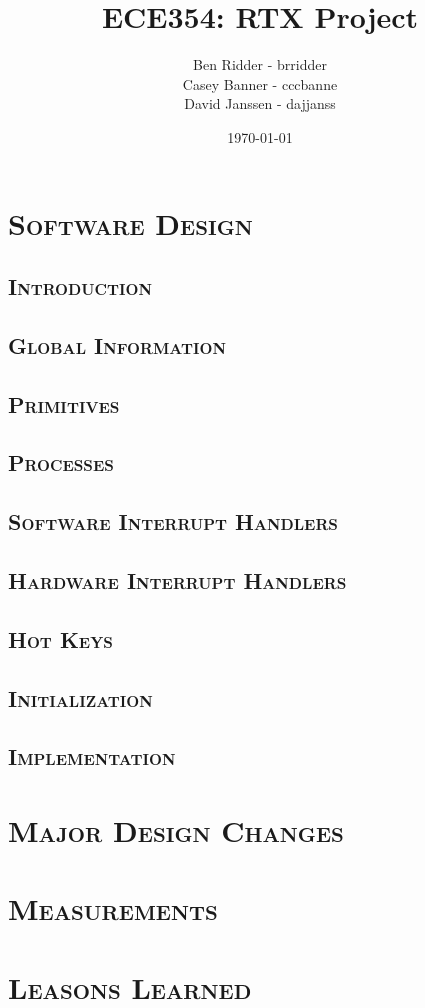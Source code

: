 \documentclass[oneside]{report}
\begin{document}
\lstset{language=C, 
        frame=single, 
        breaklines=true,
        basicstyle=\small\ttfamily,
        columns=fullflexible}

\title{ECE354: RTX Project}
\author{Ben Ridder - brridder \\
Casey Banner - cccbanne \\
David Janssen - dajjanss }
\date{\today}
\maketitle
\tableofcontents
\chapter{\textsc{Software Design}}

\section{\textsc{Introduction}}

\section{\textsc{Global Information}}

\section{\textsc{Primitives}}

\section{\textsc{Processes}}

\section{\textsc{Software Interrupt Handlers}}

\section{\textsc{Hardware Interrupt Handlers}}

\section{\textsc{Hot Keys}}

\section{\textsc{Initialization}}

\section{\textsc{Implementation}}

\chapter{\textsc{Major Design Changes}}

\chapter{\textsc{Measurements}}

\chapter{\textsc{Leasons Learned}}
\end{document}
